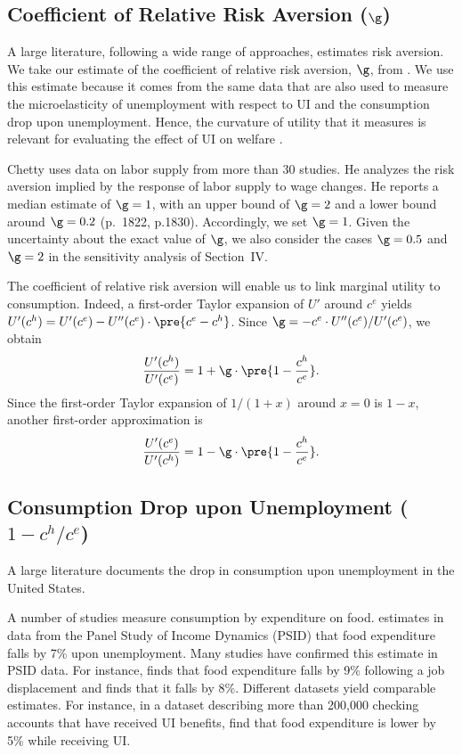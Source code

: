 \documentclass[letterpaper,12pt,leqno]{article}
\begin{document}
\subsection{Coefficient of Relative Risk Aversion ($\g$)}

A large literature, following a wide range of approaches, estimates risk aversion. We take our estimate of the coefficient of relative risk aversion, $\g$, from \citet{Ch06}. We use this estimate because it comes from the same data that are also used to measure the microelasticity of unemployment with respect to UI and the consumption drop upon unemployment. Hence, the curvature of utility that it measures is relevant for evaluating the effect of UI on welfare \citep[p.~154]{CF12}.

Chetty uses data on labor supply from more than 30 studies. He analyzes the risk aversion implied by the response of labor supply to wage changes. He reports a median estimate of $\g=1$, with an upper bound of $\g=2$ and a lower bound around $\g=0.2$ (p.~1822, p.1830). Accordingly, we set $\g=1$. Given the uncertainty about the exact value of $\g$,  we also consider the cases $\g=0.5$ and $\g=2$ in the sensitivity analysis of Section~IV.

The coefficient of relative risk aversion will enable us to link marginal utility to consumption. Indeed, a first-order Taylor expansion of $U'$ around $c^{e}$ yields $U'(c^{h}) = U'(c^{e}) - U''(c^{e})\cdot \pre{c^{e}-c^{h}}$. Since $\g=-c^{e}\cdot U''(c^{e})/U'(c^{e})$, we obtain
\begin{equation}
\frac{U'(c^{h})}{U'(c^{e})}=1+ \g\cdot \pre{1-\frac{c^{h}}{c^{e}}}.
\label{eq:gammahe}\end{equation}
Since the first-order Taylor expansion of $1/(1+x)$ around $x=0$ is $1-x$, another first-order approximation is
\begin{equation}
\frac{U'(c^{e})}{U'(c^{h})}=1-\g\cdot \pre{1-\frac{c^{h}}{c^{e}}}.
\label{eq:gammaeh}\end{equation}


\subsection{Consumption Drop upon Unemployment ($1-c^{h}/c^{e}$)} 

A large literature documents the drop in consumption upon unemployment in the United States. 

A number of studies measure consumption by expenditure on food. \citet[p.~195]{G97} estimates in data from the Panel Study of Income Dynamics (PSID) that food expenditure falls by 7\% upon unemployment. Many studies have confirmed this estimate in PSID data. For instance, \citet[p.~32]{St01} finds that food expenditure falls by 9\% following a job displacement and \citet[p.~1792]{H16} finds that it falls by 8\%.  Different datasets yield comparable estimates. For instance, in a dataset describing more than 200,000 checking accounts that have received UI benefits, \citet[Table~6, column~(3)]{GN15} find that food expenditure is lower by 5\% while receiving UI.
\end{document}
